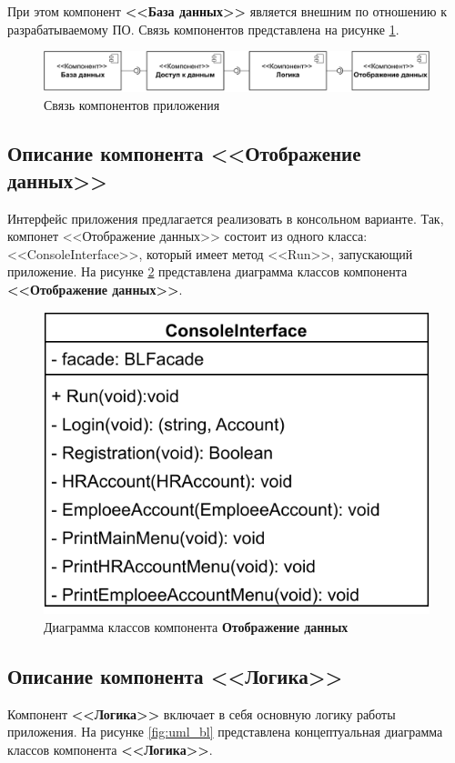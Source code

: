 \documentclass[12pt]{report}
\begin{document}
При этом компонент \textbf{<<База данных>>} является внешним по отношению к разрабатываемому ПО. Связь компонентов представлена на рисунке \ref{fig:structure}.

\begin{figure}[h!]
  \centering
  \includegraphics[width = \linewidth]{structure.pdf}
  \caption{Связь компонентов приложения}
  \label{fig:structure}
\end{figure}


\subsection{Описание компонента <<Отображение данных>>}
Интерфейс приложения предлагается реализовать в консольном варианте. Так, компонет <<Отображение данных>> состоит из одного класса: <<ConsoleInterface>>, который имеет метод <<Run>>, запускающий приложение. На рисунке \ref{fig:uml_ui} представлена диаграмма классов компонента \textbf{<<Отображение данных>>}.

\begin{figure}[h!]
	\centering
	\includegraphics[scale = 0.5]{interface.pdf}
	\caption{Диаграмма классов компонента \textbf{Отображение данных}}
	\label{fig:uml_ui}
\end{figure}

\subsection{Описание компонента <<Логика>>}
Компонент \textbf{<<Логика>>} включает в себя основную логику работы приложения. На рисунке \ref{fig:uml_bl} представлена концептуальная диаграмма классов компонента \textbf{<<Логика>>}.
\end{document}
